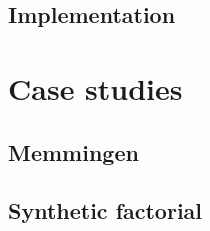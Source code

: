 \documentclass[a4paper,fleqn]{cas-dc}
\begin{document}
\subsection{Implementation}

\section{Case studies}
\label{sec:cases}


\subsection{Memmingen}


\subsection{Synthetic factorial}

\end{document}
